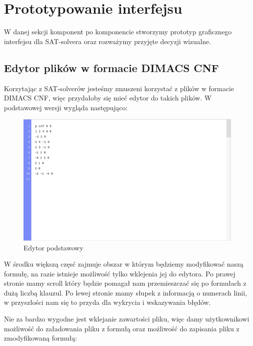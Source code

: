 \documentclass[a4paper,12pt,oneside]{book}
\theoremstyle{definition}
\begin{document}
\section{Prototypowanie interfejsu}

W danej sekcji komponent po komponencie stworzymy prototyp graficznego interfejsu dla SAT-solvera oraz rozważymy przyjęte decyzji wizualne.

\subsection{Edytor plików w formacie DIMACS CNF}

Korzytając z SAT-solverów jesteśmy zmuszeni korzystać z plików w formacie DIMACS CNF, więc przydałoby się mieć edytor do takich plików. W podstawowej wersji wygląda następująco:

\begin{figure}[ht]
    \centering
    \includegraphics[width=14.30cm]{1}
    \caption{Edytor podstawowy}
    \label{fig:1}
\end{figure}

\noindent W środku większą częsć zajmuje obszar w którym będziemy modyfikować naszą formułę, na razie istnieje możliwość tylko wklejenia jej do edytora. Po prawej stronie mamy scroll który będzie pomagał nam przemieszczać się po formułach z dużą liczbą klauzul. Po lewej stronie mamy słupek z informacją o numerach linii, w przyszłości nam się to przyda dla wykrycia i wskazywania błędów.

Nie za bardzo wygodne jest wklejanie zawartości pliku, więc damy użytkownikowi możliwość do załadowania pliku z formułą oraz możliwość do zapisania pliku z zmodyfikowaną formułą:

\newpage
\end{document}
